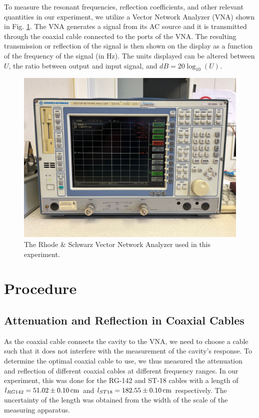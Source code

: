 \documentclass[a4paper]{report}
\numberwithin{equation}{section}
\begin{document}
To measure the resonant frequencies, reflection coefficients, and other relevant
quantities in our experiment, we utilize a Vector Network Analyzer (VNA) shown
in Fig. \ref{fig:VNA}. The VNA generates a signal from its AC source and it is
transmitted through the coaxial cable connected to the ports of the VNA. The
resulting transmission or reflection of the signal is then shown on the display
as a function of the frequency of the signal (in Hz). The units displayed can be
altered between $U$, the ratio between output and input signal, and $dB = 20
\log_{10}(U)$. \par  

\begin{figure}[hbt!]
	\centering
	\includegraphics[width=0.5\columnwidth]{VNA.jpg}
	\caption{The Rhode \& Schwarz Vector Network Analyzer used in this experiment.}

	\label{fig:VNA}
\end{figure}

\section{Procedure}

\subsection{Attenuation and Reflection in Coaxial Cables}

As the coaxial cable connects the cavity to the VNA, we need to choose a cable
such that it does not interfere with the measurement of the cavity's response.
To determine the optimal coaxial cable to use, we thus measured the attenuation
and reflection of different coaxial cables at different frequency ranges. In our
experiment, this was done for the RG-142 and ST-18 cables with a length of
$l_{RG142}=\SI{51.02 \pm 0.10}{\centi\meter}$ and $l_{ST18}=\SI{182.55 \pm
0.10}{\centi\meter}$ respectively. The uncertainty of the length was obtained
from the width of the scale of the measuring apparatus. \par 
\end{document}
